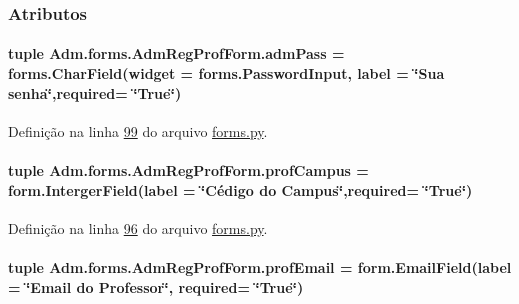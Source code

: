 \subsubsection{Atributos}
\hypertarget{classAdm_1_1forms_1_1AdmRegProfForm_aa9a564546d369e53f8512a473669b78d}{
\paragraph[{adm\-Pass}]{\setlength{\rightskip}{0pt plus 5cm}tuple Adm.\-forms.\-Adm\-Reg\-Prof\-Form.\-adm\-Pass = forms.\-Char\-Field(widget = forms.\-Password\-Input, label = \char`\"{}Sua senha\char`\"{},required= \char`\"{}True\char`\"{})\hspace{0.3cm}{\ttfamily [static]}}}\label{classAdm_1_1forms_1_1AdmRegProfForm_aa9a564546d369e53f8512a473669b78d}


Definição na linha \hyperlink{Adm_2forms_8py_source_l00099}{99} do arquivo \hyperlink{Adm_2forms_8py_source}{forms.\-py}.

\hypertarget{classAdm_1_1forms_1_1AdmRegProfForm_a0c90beb927b61260feb194030798db38}{
\paragraph[{prof\-Campus}]{\setlength{\rightskip}{0pt plus 5cm}tuple Adm.\-forms.\-Adm\-Reg\-Prof\-Form.\-prof\-Campus = form.\-Interger\-Field(label = \char`\"{}Cédigo do Campus\char`\"{},required= \char`\"{}True\char`\"{})\hspace{0.3cm}{\ttfamily [static]}}}\label{classAdm_1_1forms_1_1AdmRegProfForm_a0c90beb927b61260feb194030798db38}


Definição na linha \hyperlink{Adm_2forms_8py_source_l00096}{96} do arquivo \hyperlink{Adm_2forms_8py_source}{forms.\-py}.

\hypertarget{classAdm_1_1forms_1_1AdmRegProfForm_a56c1eca35253b136bf8886135c9633b0}{
\paragraph[{prof\-Email}]{\setlength{\rightskip}{0pt plus 5cm}tuple Adm.\-forms.\-Adm\-Reg\-Prof\-Form.\-prof\-Email = form.\-Email\-Field(label = \char`\"{}Email do Professor\char`\"{}, required= \char`\"{}True\char`\"{})\hspace{0.3cm}{\ttfamily [static]}}}\label{classAdm_1_1forms_1_1AdmRegProfForm_a56c1eca35253b136bf8886135c9633b0}


